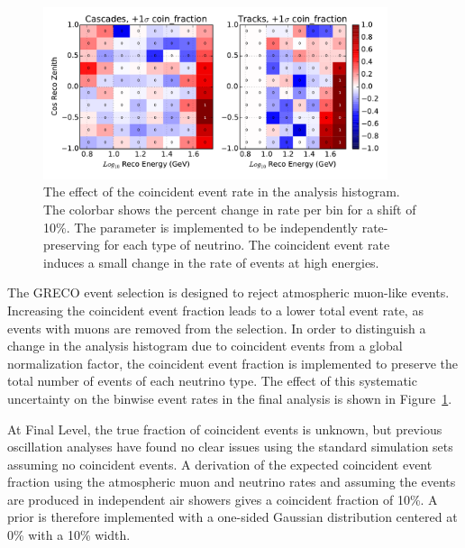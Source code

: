 \begin{figure}
\centering
\includegraphics[width=0.9\textwidth]{systematics/coin_fraction_variation.pdf} 
\caption[Effect of the coincident events in the analysis histogram]{The effect of the coincident event rate in the analysis histogram. The colorbar shows the percent change in rate per bin for a shift of 10\%. The parameter is implemented to be independently rate-preserving for each type of neutrino. The coincident event rate induces a small change in the rate of events at high energies.}
\label{fig:systematics_coin_fraction}
\end{figure}

The GRECO event selection is designed to reject atmospheric muon-like events.
Increasing the coincident event fraction leads to a lower total event rate, as events with muons are removed from the selection.
In order to distinguish a change in the analysis histogram due to coincident events from a global normalization factor, the coincident event fraction is implemented to preserve the total number of events of each neutrino type.
The effect of this systematic uncertainty on the binwise event rates in the final analysis is shown in Figure~\ref{fig:systematics_coin_fraction}.

At Final Level, the true fraction of coincident events is unknown, but previous oscillation analyses have found no clear issues using the standard simulation sets assuming no coincident events.
A derivation of the expected coincident event fraction using the atmospheric muon and neutrino rates and assuming the events are produced in independent air showers gives a coincident fraction of 10\%.
A prior is therefore implemented with a one-sided Gaussian distribution centered at 0\% with a 10\% width.

